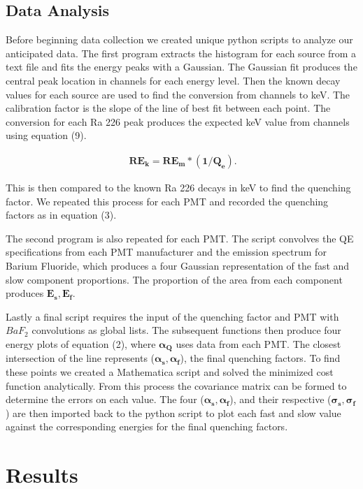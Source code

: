 \documentclass[aip, jmp, amsmath, amssymb, reprint, floatfix]{revtex4-1}
\begin{document}
\subsection{\label{sec:level2}Data Analysis}

Before beginning data collection we created unique python scripts to analyze our anticipated data. The first program extracts the histogram for each source from a text file and fits the energy peaks with a Gaussian. The Gaussian fit produces the central peak location in channels for each energy level. Then the known decay values for each source are used to find the conversion from channels to keV. The calibration factor is the slope of the line of best fit between each point. The conversion for each Ra 226 peak produces the expected keV value from channels using equation (9).

\begin{eqnarray}
\ \bm{RE_k = RE_m * (1/Q_e)}
\label{eq:nine}.
\end{eqnarray}

This is then compared to the known Ra 226 decays in keV to find the quenching factor. We repeated this process for each PMT and recorded the quenching factors as in equation (3). 

The second program is also repeated for each PMT. The script convolves the QE specifications from each PMT manufacturer and the emission spectrum for Barium Fluoride, which produces a four Gaussian representation of the fast and slow component proportions. The proportion of the area from each component produces $\bm{E_s, E_f}$. 

Lastly a final script requires the input of the quenching factor and PMT with $BaF_2$ convolutions as global lists. The subsequent functions then produce four energy plots of equation (2), where $\bm{\alpha_Q}$ uses data from each PMT. The closest intersection of the line represents ($\bm{\alpha_s, \alpha_f}$), the final quenching factors. To find these points we created a Mathematica script and solved the minimized cost function analytically. From this process the covariance matrix can be formed to determine the errors on each value. The four ($\bm{\alpha_s, \alpha_f}$), and their respective ($\bm{\sigma_s, \sigma_f}$) are then imported back to the python script to plot each fast and slow value against the corresponding energies for the final quenching factors. 

\section{\label{sec:level1}Results}
\end{document}
